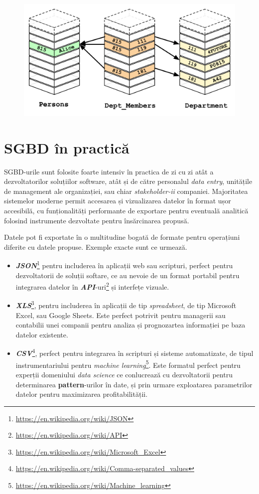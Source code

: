 \documentclass[12pt. a4paper]{report}
\begin{document}
\begin{figure}
\center
\includegraphics[width=\textwidth]{relational_databases_demo}
\end{figure}

\section{SGBD în practică}
SGBD-urile sunt folosite foarte intensiv în practica de zi cu zi atât a dezvoltatorilor soluțiilor software, atât și de către personalul \emph{data entry}, unitățile de management ale organizației, sau chiar \emph{stakeholder-ii} companiei. Majoritatea sistemelor moderne permit accesarea și vizualizarea datelor în format ușor accesibilă, cu funționalități performante de exportare pentru eventuală analitică folosind instrumente dezvoltate pentru însărcinarea propusă. 

Datele pot fi exportate în o multitudine bogată de formate pentru operațiuni diferite cu datele propuse. Exemple exacte sunt ce urmează.
\begin{itemize}
	\item  \emph{\textbf{JSON}}\footnote{\url{https://en.wikipedia.org/wiki/JSON}} pentru includerea în aplicații web sau scripturi, perfect pentru dezvoltatorii de soluții softare, ce au nevoie de un format portabil pentru integrarea datelor în \emph{\textbf{API}}-uri\footnote{\url{https://en.wikipedia.org/wiki/API}} și interfețe vizuale. 
	
	\item \emph{\textbf{XLS}}\footnote{\url{https://en.wikipedia.org/wiki/Microsoft_Excel}}, pentru includerea în aplicații de tip \emph{spreadsheet}, de tip Microsoft Excel, sau Google Sheets. 
	Este perfect potrivit pentru managerii sau contabilii unei companii pentru analiza și prognozartea informației pe baza datelor existente.
	
	\item \emph{\textbf{CSV}}\footnote{\url{https://en.wikipedia.org/wiki/Comma-separated_values}}, perfect pentru integrarea în scripturi și sisteme automatizate, de tipul instrumentariului pentru \emph{machine learning}\footnote{\url{https://en.wikipedia.org/wiki/Machine_learning}}. Este formatul perfect pentru experții domeniului \emph{data science} ce conlucrează cu dezvoltatorii pentru determinarea \textbf{pattern}-urilor în date, și prin urmare exploatarea parametrilor datelor pentru maximizarea profitabilității.
\end{itemize}
\end{document}
